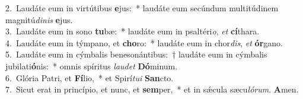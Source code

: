 {2.~}Laudáte eum in virtútibus \textbf{e}jus:~* laudáte eum secúndum multitúdinem magnitú\textit{di}\textit{nis} \textbf{e}jus.\\
{3.~}Laudáte eum in sono \textbf{tu}bæ:~* laudáte eum in psaltéri\textit{o}, \textit{et} \textbf{cí}thara.\\
{4.~}Laudáte eum in týmpano, et \textbf{cho}ro:~* laudáte eum in chor\textit{dis}, \textit{et} \textbf{ór}gano.\\
{5.~}Laudáte eum in cýmbalis benesonántibus:~† laudáte eum in cýmbalis jubilati\textbf{ó}nis:~* omnis spíritus \textit{lau}\textit{det} \textbf{Dó}minum.\\
{6.~}Glória Patri, et \textbf{Fí}lio,~* et Spirí\textit{tu}\textit{i} \textbf{San}cto.\\
{7.~}Sicut erat in princípio, et nunc, et \textbf{sem}per,~* et in sǽcula sæcu\textit{ló}\textit{rum}. \textbf{A}men.\\
